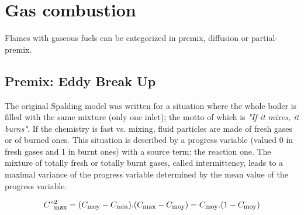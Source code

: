 
%
%
%
%


\section{ Gas combustion}

Flames with gaseous fuels can be categorized in premix, diffusion or
partial-premix.

\subsection{Premix: Eddy Break Up}

The original Spalding model \cite{Spalding:1971a} was written for a situation where the whole
boiler is filled with the same mixture (only one inlet); the motto of which is
\textit{"If it mixes, it burns"}. If the chemistry is fast vs. mixing, fluid
particles are made of fresh gases or of burned ones. This situation is described
by a progress variable (valued 0 in fresh gases and 1 in burnt ones) with a
source term: the reaction one. The mixture of totally fresh or totally burnt
gases, called intermittency, leads to a maximal variance of the progress
variable determined by the mean value of the progress variable.

\begin{equation}
C"^{2}_{\mbox{\footnotesize max}} = (C_{\mbox{\footnotesize moy}} -C_{\mbox{\footnotesize min}}).(C_{\mbox{\footnotesize max}}-C_{\mbox{\footnotesize moy}}) = C_{\mbox{\footnotesize moy}} . (1-C_{\mbox{\footnotesize moy}})
\end{equation}

